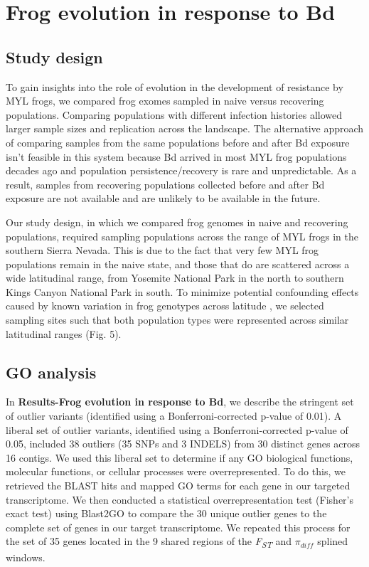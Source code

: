 \documentclass[9pt,twoside,lineno]{pnas-new}
\begin{document}
\hypertarget{frog-evolution-in-response-to-bd-2}{%
\section{Frog evolution in response to
Bd}\label{frog-evolution-in-response-to-bd-2}}

\hypertarget{study-design}{%
\subsection{Study design}\label{study-design}}

To gain insights into the role of evolution in the development of
resistance by MYL frogs, we compared frog exomes sampled in naive versus
recovering populations. Comparing populations with different infection
histories allowed larger sample sizes and replication across the
landscape. The alternative approach of comparing samples from the same
populations before and after Bd exposure isn't feasible in this system
because Bd arrived in most MYL frog populations decades ago and
population persistence/recovery is rare and unpredictable. As a result,
samples from recovering populations collected before and after Bd
exposure are not available and are unlikely to be available in the
future.

Our study design, in which we compared frog genomes in naive and
recovering populations, required sampling populations across the range
of MYL frogs in the southern Sierra Nevada. This is due to the fact that
very few MYL frog populations remain in the naive state, and those that
do are scattered across a wide latitudinal range, from Yosemite National
Park in the north to southern Kings Canyon National Park in south. To
minimize potential confounding effects caused by known variation in frog
genotypes across latitude \citep{byrne2023}, we selected sampling sites
such that both population types were represented across similar
latitudinal ranges (Fig. 5).

\hypertarget{go-analysis}{%
\subsection{GO analysis}\label{go-analysis}}

In \textbf{Results-Frog evolution in response to Bd}, we describe the
stringent set of outlier variants (identified using a
Bonferroni-corrected p-value of 0.01). A liberal set of outlier
variants, identified using a Bonferroni-corrected p-value of 0.05,
included 38 outliers (35 SNPs and 3 INDELS) from 30 distinct genes
across 16 contigs. We used this liberal set to determine if any GO
biological functions, molecular functions, or cellular processes were
overrepresented. To do this, we retrieved the BLAST hits and mapped GO
terms for each gene in our targeted transcriptome. We then conducted a
statistical overrepresentation test (Fisher's exact test) using Blast2GO
\citep{conesa2005} to compare the 30 unique outlier genes to the
complete set of genes in our target transcriptome. We repeated this
process for the set of 35 genes located in the 9 shared regions of the
\emph{F\textsubscript{ST}} and \(\pi_{diff}\) splined windows.
\end{document}
